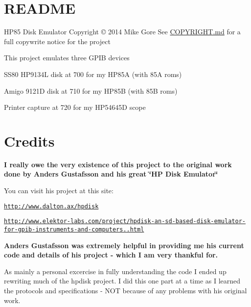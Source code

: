 \hypertarget{md_README_README}{}\section{R\-E\-A\-D\-M\-E}\label{md_README_README}
\begin{DoxyParagraph}{H\-P85 Disk Emulator Copyright \copyright{} 2014 Mike Gore}
See \hyperlink{md_COPYRIGHT}{C\-O\-P\-Y\-R\-I\-G\-H\-T.md} for a full copywrite notice for the project
\end{DoxyParagraph}
This project emulates three G\-P\-I\-B devices
\begin{DoxyItemize}
\item S\-S80 H\-P9134\-L disk at 700 for my H\-P85\-A (with 85\-A roms)
\item Amigo 9121\-D disk at 710 for my H\-P85\-B (with 85\-B roms)
\item Printer capture at 720 for my H\-P54645\-D scope
\end{DoxyItemize}





\section*{Credits}

{\bfseries I really owe the very existence of this project to the original work done by Anders Gustafsson and his great \char`\"{}\-H\-P Disk Emulator\char`\"{} }
\begin{DoxyItemize}
\item You can visit his project at this site\-:
\begin{DoxyItemize}
\item \href{http://www.dalton.ax/hpdisk}{\tt http\-://www.\-dalton.\-ax/hpdisk}
\item \href{http://www.elektor-labs.com/project/hpdisk-an-sd-based-disk-emulator-for-gpib-instruments-and-computers.13693.html}{\tt http\-://www.\-elektor-\/labs.\-com/project/hpdisk-\/an-\/sd-\/based-\/disk-\/emulator-\/for-\/gpib-\/instruments-\/and-\/computers..\-html}
\end{DoxyItemize}
\end{DoxyItemize}

{\bfseries Anders Gustafsson was extremely helpful in providing me his current code and details of his project -\/ which I am very thankful for.}

As mainly a personal excercise in fully understanding the code I ended up rewriting much of the hpdisk project. I did this one part at a time as I learned the protocols and specifications -\/ N\-O\-T because of any problems with his original work.

